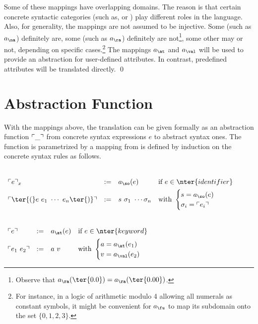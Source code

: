 \begin{remark}
Some of these mappings have overlapping domains.
The reason is that certain concrete syntactic categories 
(such as,  or )
play different roles in the language.
Also, for generality, the mappings are not assumed to be injective.
Some (such as $a_{\na}$) definitely are, 
some (such as $a_{\ra}$) definitely are not\footnote{
Observe that $a_\ra(\ter{0.0}) = a_\ra(\ter{0.00})$.
},
some other may or not, depending on specific cases.\footnote{
For instance, 
in a logic of arithmetic modulo 4 allowing all numerals
as constant symbols,
it might be convenient for $a_{\fu}$ to map its
 subdomain onto the set $\{0,1,2,3\}$.
}
The mappings $a_{\at}$ and $a_{\val}$ will be used 
to provide an abstraction for user-defined attributes.
In contrast, predefined attributes will be translated directly.
\qed
\end{remark}


\section*{Abstraction Function}

With the mappings above, the translation can be given formally
as an abstraction function $\ulcorner\_\urcorner$ from concrete syntax expressions $e$
to abstract syntax ones.
The function is parametrized by a mapping from 
 is defined by induction on the concrete syntax rules as follows.\bigskip

\noindent {} \\

\(
\begin{array}{llll}
 \tr{e}_x & := & a_{\so}(e)
 & \text{if } e \in \nter{identifier}
 \\[1ex]
 \tr{\ter{(}e\ e_1\ \cdots\ e_n \ter{)}}  & := & s\ \sigma_1\ \cdots \sigma_n &
 \text{with } \begin{cases} s = a_{\so}(e)\\ \sigma_i = \tr{e_i}\end{cases}
\end{array}
\)
\bigskip

\noindent {} \\

\(
\begin{array}{llll}
 \tr{e} & := & a_{\at}(e)
 & \text{if } e \in \nter{keyword}
 \\[1ex]
 \tr{e_1\ e_2}  & := & a\ v &
 \text{with } \begin{cases} a = a_{\at}(e_1)\\ v = a_{\val}(e_2)\end{cases}
\end{array}
\)
\bigskip

